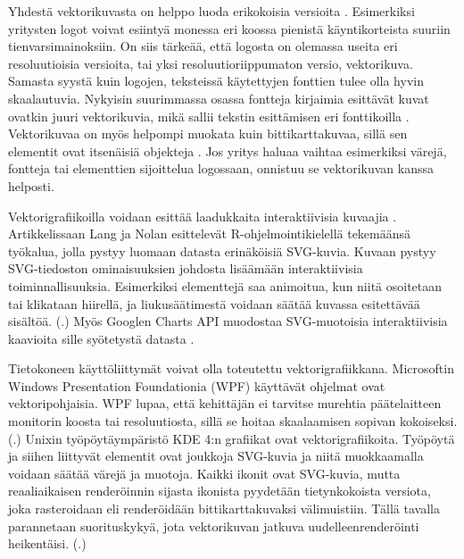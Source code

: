 \documentclass[utf8,bachelor]{gradu3}
\newcommand{\parencitedot}[1]{(\cite{#1}.)}
\begin{document}
Yhdestä vektorikuvasta on helppo luoda erikokoisia versioita \parencite{RefWorks:doc:5bdc5224e4b05afcfde5b159}. Esimerkiksi yritysten logot voivat esiintyä monessa eri koossa pienistä käyntikorteista suuriin tienvarsimainoksiin. On siis tärkeää, että logosta on olemassa useita eri resoluutioisia versioita, tai yksi resoluutioriippumaton versio, vektorikuva. Samasta syystä kuin logojen, teksteissä käytettyjen fonttien tulee olla hyvin skaalautuvia. Nykyisin suurimmassa osassa fontteja kirjaimia esittävät kuvat ovatkin juuri vektorikuvia, mikä sallii tekstin esittämisen eri fonttikoilla \parencite{RefWorks:doc:5bdc5224e4b05afcfde5b159}. Vektorikuvaa on myös helpompi muokata kuin bittikarttakuvaa, sillä sen elementit ovat itsenäisiä objekteja \parencite{RefWorks:doc:5bdc5224e4b05afcfde5b159}. Jos yritys haluaa vaihtaa esimerkiksi värejä, fontteja tai elementtien sijoittelua logossaan, onnistuu se vektorikuvan kanssa helposti.

Vektorigrafiikoilla voidaan esittää laadukkaita interaktiivisia kuvaajia \parencite{RefWorks:doc:5bdc736ae4b05afcfde5d6e4}. Artikkelissaan Lang ja Nolan esittelevät R-ohjelmointikielellä tekemäänsä työkalua, jolla pystyy luomaan datasta erinäköisiä SVG-kuvia. Kuvaan pystyy SVG-tiedoston ominaisuuksien johdosta lisäämään interaktiivisia toiminnallisuuksia. Esimerkiksi elementtejä saa animoitua, kun niitä osoitetaan tai klikataan hiirellä, ja liukusäätimestä voidaan säätää kuvassa esitettävää sisältöä. \parencitedot{RefWorks:doc:5bdc736ae4b05afcfde5d6e4} Myös Googlen Charts API muodostaa SVG-muotoisia interaktiivisia kaavioita sille syötetystä datasta \parencite{RefWorks:doc:5bde1508e4b0afdabde34e20}.

Tietokoneen käyttöliittymät voivat olla toteutettu vektorigrafiikkana. Microsoftin Windows Presentation Foundationia (WPF) käyttävät ohjelmat ovat vektoripohjaisia. WPF lupaa, että kehittäjän ei tarvitse murehtia päätelaitteen monitorin koosta tai resoluutiosta, sillä se hoitaa skaalaamisen sopivan kokoiseksi. \parencitedot{RefWorks:doc:5bde3d66e4b0a1f99c63ae5a} Unixin työpöytäympäristö KDE 4:n grafiikat ovat vektorigrafiikoita. Työpöytä ja siihen liittyvät elementit ovat joukkoja SVG-kuvia ja niitä muokkaamalla voidaan säätää värejä ja muotoja. Kaikki ikonit ovat SVG-kuvia, mutta reaaliaikaisen renderöinnin sijasta ikonista pyydetään tietynkokoista versiota, joka rasteroidaan eli renderöidään bittikarttakuvaksi välimuistiin. Tällä tavalla parannetaan suorituskykyä, jota vektorikuvan jatkuva uudelleenrenderöinti heikentäisi. \parencitedot{RefWorks:doc:5bded7f3e4b09dfad48b846c}
\end{document}
